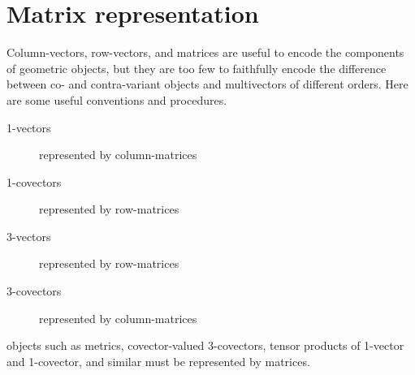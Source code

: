 \documentclass[\ifafour a4paper,12pt,\else a5paper,10pt,\fi%
onecolumn,oneside,article,%
british%
]{memoir}
\theoremstyle{remark}
\theoremstyle{innote}
\renewcommand*{\|}[1][]{\nonscript\:#1\vert\nonscript\:\mathopen{}}
\begin{document}
\bigskip
\appendix

\section{Matrix representation}
\label{sec:matrix_repr}

Column-vectors, row-vectors, and matrices are useful to encode the components of geometric objects, but they are too few to faithfully encode the difference between co- and contra-variant objects and multivectors of different orders. Here are some useful conventions and procedures.

\begin{description}
\item[1-vectors] represented by column-matrices
\item[1-covectors] represented by row-matrices
\item[3-vectors] represented by row-matrices
\item[3-covectors] represented by column-matrices
\end{description}
objects such as metrics, covector-valued 3-covectors, tensor products of 1-vector and 1-covector, and similar must be represented by matrices.
\end{document}
